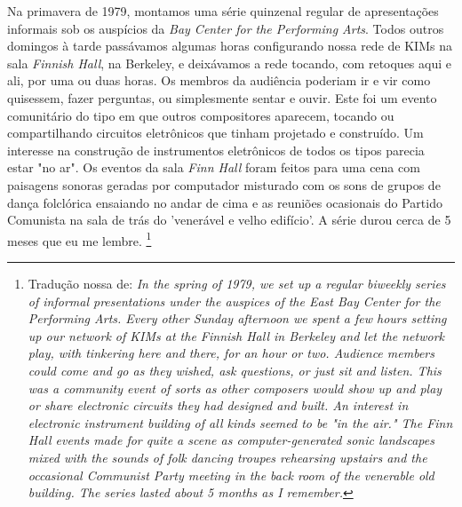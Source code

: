 
\begin{citacao}
Na primavera de 1979, montamos uma série quinzenal regular de apresentações informais sob os auspícios da \emph{Bay Center for the Performing Arts}. Todos outros domingos à tarde passávamos algumas horas configurando nossa rede de KIMs na sala \emph{Finnish Hall}, na Berkeley, e deixávamos a rede tocando, com retoques aqui e ali, por uma ou duas horas. Os membros da audiência poderiam ir e vir como quisessem, fazer perguntas, ou simplesmente sentar e ouvir. Este foi um evento comunitário do tipo em que outros compositores aparecem, tocando ou compartilhando circuitos eletrônicos que tinham projetado e construído. Um interesse na construção de instrumentos eletrônicos de todos os tipos parecia estar "no ar". Os eventos da sala \emph{Finn Hall} foram feitos para uma cena com paisagens sonoras geradas por computador misturado com os sons de grupos de dança folclórica ensaiando no andar de cima e as reuniões ocasionais do Partido Comunista na sala de trás do 'venerável e velho edifício'. A série durou cerca de 5 meses que eu me lembre. \cite[online]{brown_indigenous_2013}\footnote{Tradução nossa de: \emph{In the spring of 1979, we set up a regular biweekly series of informal presentations under the auspices of the East Bay Center for the Performing Arts. Every other Sunday afternoon we spent a few hours setting up our network of KIMs at the Finnish Hall in Berkeley and let the network play, with tinkering here and there, for an hour or two. Audience members could come and go as they wished, ask questions, or just sit and listen. This was a community event of sorts as other composers would show up and play or share electronic circuits they had designed and built. An interest in electronic instrument building of all kinds seemed to be "in the air." The Finn Hall events made for quite a scene as computer-generated sonic landscapes mixed with the sounds of folk dancing troupes rehearsing upstairs and the occasional Communist Party meeting in the back room of the venerable old building. The series lasted about 5 months as I remember.}}
\end{citacao}

